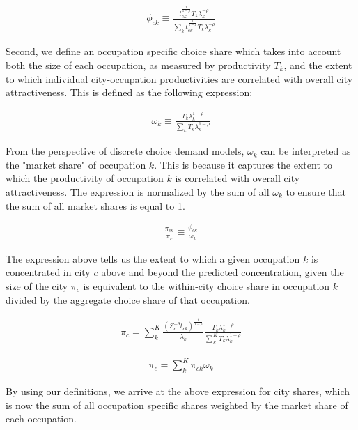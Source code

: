 \documentclass[10pt]{article}
\begin{document}
\begin{align}
    \phi_{ck} \equiv \frac{{t^{\frac{1}{1-\rho}}_{ck}}{T_{k}}\lambda_{k}^{-\rho}}{\sum\limits_{k}{t^{\frac{1}{1-\rho}}_{ck}}{T_{k}}\lambda_{k}^{-\rho}}
    \label{occupation_by_city_shares}
\end{align}

Second, we define an occupation specific choice share which takes into account both the size of each occupation, as measured by productivity $T_k$, and the extent to which individual city-occupation productivities are correlated with overall city attractiveness. This is defined as the following expression:

\begin{align}
    \omega_k \equiv \frac{{T_{k}}\lambda_{k}^{1-\rho}}{\sum\limits_{k}{T_{k}}\lambda_{k}^{1-\rho}}
    \label{occupation_shares}
\end{align}

From the perspective of discrete choice demand models, $\omega_k$ can be interpreted as the "market share" of occupation $k$. This is because it captures the extent to which the productivity of occupation $k$ is correlated with overall city attractiveness. The expression is normalized by the sum of all $\omega_k$ to ensure that the sum of all market shares is equal to 1.

\begin{align}
    \frac{\pi_{ck}}{\pi_c}\equiv \frac{\phi_{ck}}{\omega_k}
    \label{identity}
\end{align}

The expression above tells us the extent to which a given occupation $k$ is concentrated in city $c$ above and beyond the predicted concentration, given the size of the city $\pi_c$ is equivalent to the within-city choice share in occupation $k$ divided by the aggregate choice share of that occupation.

\begin{align*}
    \pi_{c} = \sum_{k}^{K} \frac{(Z_{c}^{-\theta} t_{ck})^{\frac{1}{1-\rho}}}{\lambda_k} \frac{T_k \lambda_{k}^{1 - \rho}}{\sum \limits_{k}^{K} T_k \lambda_{k}^{1-\rho}}
\end{align*}

\begin{align}
    \pi_c = \sum_{k}^{K} \pi_{ck} \omega_k
\end{align}

By using our definitions, we arrive at the above expression for city shares, which is now the sum of all occupation specific shares weighted by the market share of each occupation.
\end{document}
